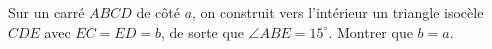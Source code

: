 Sur un carré $ABCD$ de côté $a$, on construit vers l'intérieur un triangle isocèle $CDE$ avec $EC = ED = b$, de sorte que $\angle ABE = 15^\circ$. Montrer que $b = a$.
